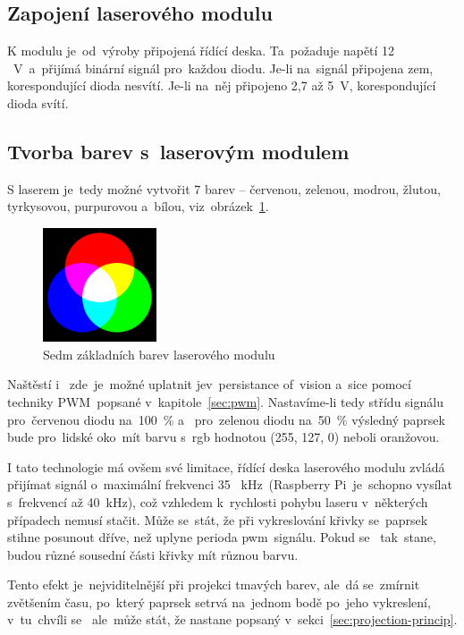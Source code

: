 \subsection{Zapojení laserového modulu}
K modulu je~od~výroby připojená řídící deska. Ta~požaduje napětí 12 ~V~a~přijímá binární signál  pro~každou diodu. Je-li na~signál připojena zem, korespondující dioda nesvítí. Je-li na~něj připojeno 2,7 až 5~V, korespondující dioda svítí.

\subsection{Tvorba barev  s~laserovým modulem}
S laserem je~tedy možné vytvořit 7 barev -- červenou, zelenou, modrou, žlutou, tyrkysovou, purpurovou a~bílou,  viz~obrázek~\ref{fig:7colors}.

\begin{figure}[htb]
  \centering
  \includegraphics[width=0.3\textwidth]{img/7colors.png}
  \caption{\label{fig:7colors} Sedm základních barev laserového modulu}
\end{figure}

Naštěstí i ~zde~je~možné uplatnit  jev~persistance of~vision a~sice pomocí techniky  PWM~popsané  v~kapitole~\ref{sec:pwm}.
Nastavíme-li tedy střídu signálu  pro~červenou diodu na~100~\% a ~pro~zelenou diodu na~50~\% výsledný paprsek bude  pro~lidské  oko~mít barvu  s~rgb hodnotou (255, 127, 0) neboli oranžovou.

I tato technologie má ovšem své limitace, řídící deska laserového modulu zvládá přijímat signál  o~maximální frekvenci 35 ~kHz~(Raspberry Pi~je~schopno vysílat  s~frekvencí až 40~kHz), což vzhledem  k~rychlosti pohybu laseru  v~některých případech nemusí stačit.
Může se~stát, že při vykreslování křivky se~paprsek stihne posunout dříve, než uplyne perioda  pwm~signálu. Pokud se ~tak~stane, budou různé sousední části křivky mít různou barvu.


Tento efekt je~nejviditelnější při projekci tmavých barev,  ale~dá se~zmírnit zvětšením času, po~který paprsek setrvá na~jednom bodě po~jeho vykreslení,  v~tu~chvíli se ~ale~může stát, že nastane  popsaný v~sekci~\ref{sec:projection-princip}.